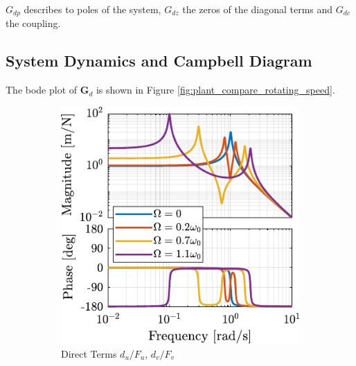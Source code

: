 \documentclass{ISMA_USD2020}
\begin{document}
\(G_{dp}\) describes to poles of the system, \(G_{dz}\) the zeros of the diagonal terms and \(G_{dc}\) the coupling.

\subsection{System Dynamics and Campbell Diagram}
\label{sec:org24f5f5f}
The bode plot of \(\bm{G}_d\) is shown in Figure \ref{fig:plant_compare_rotating_speed}.

\begin{figure}[htbp]
\begin{subfigure}[c]{0.45\linewidth}
\includegraphics[width=\linewidth]{figs/plant_compare_rotating_speed_direct.pdf}
\caption{\label{fig:plant_compare_rotating_speed_direct} Direct Terms \(d_u/F_u\), \(d_v/F_v\)}
\end{subfigure}
\begin{subfigure}[c]{0.45\linewidth}

\end{subfigure}
\end{figure}
\end{document}
